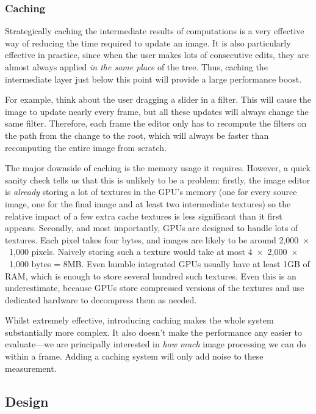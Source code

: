 \documentclass[12pt]{article}
\begin{document}
\subsubsection{Caching}

Strategically caching the intermediate results of computations is a very effective way of reducing
the time required to update an image.  It is also particularly effective in practice, since when the
user makes lots of consecutive edits, they are almost always applied \emph{in the same place} of the
tree.  Thus, caching the intermediate layer just below this point will provide a large performance
boost.

For example, think about the user dragging a slider in a filter.  This will cause the image to
update nearly every frame, but all these updates will always change the same filter.  Therefore,
each frame the editor only has to recompute the filters on the path from the change to the root,
which will always be faster than recomputing the entire image from scratch.

The major downside of caching is the memory usage it requires.  However, a quick sanity check tells
us that this is unlikely to be a problem: firstly, the image editor is \emph{already} storing a lot
of textures in the GPU's memory (one for every source image, one for the final image and at least
two intermediate textures) so the relative impact of a few extra cache textures is less significant
than it first appears.  Secondly, and most importantly, GPUs are designed to handle lots of
textures.  Each pixel takes four bytes, and images are likely to be around 2,000~$\times$~1,000
pixels.  Naively storing such a texture would take at most 4~$\times$~2,000~$\times$~1,000 bytes =
8MB.  Even humble integrated GPUs usually have at least 1GB of RAM, which is enough to store several
hundred such textures.  Even this is an underestimate, because GPUs store compressed versions of the
textures and use dedicated hardware to decompress them as needed.

Whilst extremely effective, introducing caching makes the whole system substantially more complex.
It also doesn't make the performance any easier to evaluate---we are principally interested in
\emph{how much} image processing we can do within a frame.  Adding a caching system will only add
noise to these measurement.

\subsection{Design}
\end{document}
